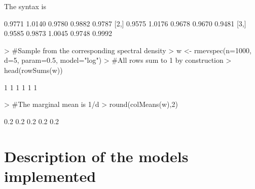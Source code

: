 \documentclass{article}
\begin{document}
The syntax is
\begin{Schunk}
\begin{Soutput}
       [,1]   [,2]   [,3]   [,4]   [,5]
[1,] 0.9771 1.0140 0.9780 0.9882 0.9787
[2,] 0.9575 1.0176 0.9678 0.9670 0.9481
[3,] 0.9585 0.9873 1.0045 0.9748 0.9992
\end{Soutput}
\begin{Sinput}
> #Sample from the corresponding spectral density
> w <- rmevspec(n=1000, d=5, param=0.5, model="log")
> #All rows sum to 1 by construction
> head(rowSums(w))
\end{Sinput}
\begin{Soutput}
[1] 1 1 1 1 1 1
\end{Soutput}
\begin{Sinput}
> #The marginal mean is 1/d
> round(colMeans(w),2)
\end{Sinput}
\begin{Soutput}
[1] 0.2 0.2 0.2 0.2 0.2
\end{Soutput}
\end{Schunk}

\section{Description of the models implemented}
\end{document}
